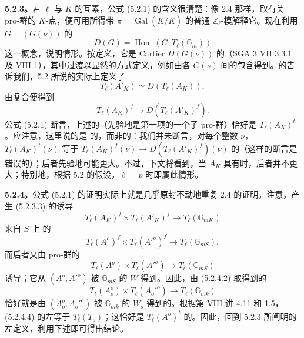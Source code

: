 \textbf{5.2.3。}若 $\ell$ 与 $K$ 的互素，公式 (5.2.1) 的含义很清楚：像 2.4 那样，取有关 pro-群的 $\overline K$-点，便可用所得带 $\pi=\operatorname{Gal}(\overline K/K)$ 的普通 $\mathbb Z_\ell$-模解释它。现在利用  $G=(G(\nu))$ 的
\[
D(G)=\operatorname{Hom}(G,T_\ell(\mathbb G_m))\tag{5.2.3.1}
\]
这一概念，说明情形。按定义，它是 Cartier  $D(G(\nu))$ 的（SGA 3 VII 3.3.1 及 VIII 1），其中过渡以显然的方式定义，例如由各 $G(\nu)$ 间的包含得到。的告诉我们，5.2 所说的实际上定义了
\[
T_\ell(A'_K)\simeq D(T_\ell(A_K)),\tag{5.2.3.2}
\]
由复合便得到
\[
T_\ell(A_K)^f\longrightarrow D(T_\ell(A'_K)^f).\tag{5.2.3.3}
\]
公式 (5.2.1) 断言，上述的（先验地是第一项的一个子 pro-群）恰好是 $T_\ell(A_K)^t$。应注意，这里说的是 的，而非的：我们并未断言，对每个整数 $\nu$，$T_\ell(A_K)^t(\nu)$ 等于
$T_\ell(A_K)^f(\nu)\to D(T_\ell(A'_K)^f)(\nu)$ 的（这样的断言是错误的）；后者先验地可能更大。不过，下文将看到，当 $A_K$ 具有时，后者并不更大；特别地，根据 5.2 的假设，$\ell=p$ 时即属此情形。

\textbf{5.2.4。}公式 (5.2.1) 的证明实际上就是几乎原封不动地重复 2.4 的证明。注意，产生 (5.2.3.3) 的诱导
\[
T_\ell(A_K)^f\times T_\ell(A'_K)^f\longrightarrow T_\ell(\mathbb G_{mK})\tag{5.2.4.1}
\]
来自 $S$ 上 的
\[
T_\ell(A^o)^f\times T_\ell(A'^o)^f\longrightarrow T_\ell(\mathbb G_{mS}),\tag{5.2.4.2}
\]
而后者又由 pro-群的
\[
T_\ell(A^o)\times T_\ell(A'^o)\longrightarrow T_\ell(\mathbb G_{mS})\tag{5.2.4.3}
\]
诱导；它从 $(A^o,A'^o)$ 被 $\mathbb G_{mS}$ 的 $W$ 得到。因此，由 (5.2.4.2) 取得到的
\[
T_\ell(A_o^o)\times T_\ell(A_o'^o)\longrightarrow T_\ell(\mathbb G_{mk})\tag{5.2.4.4}
\]
恰好就是由 $(A_o^o,A_o'^o)$ 被 $\mathbb G_{mk}$ 的 $W_o$ 得到的。根据第 VIII 讲 4.11 和 1.5， (5.2.4.4) 的左等于 $T_\ell(T_o)$；这恰好是 $T_\ell(A^o)^t$ 的。因此，回到 5.2.3 所阐明的左定义，利用下述即可得出结论。

